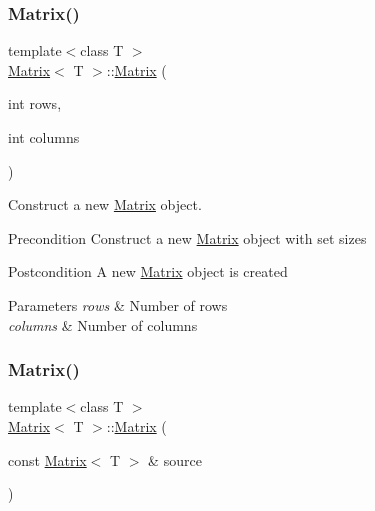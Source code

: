 \subsubsection{\texorpdfstring{Matrix()}{Matrix()}\hspace{0.1cm}{\footnotesize\ttfamily [2/3]}}
{\footnotesize\ttfamily template$<$class T $>$ \\
\mbox{\hyperlink{class_matrix}{Matrix}}$<$ T $>$\+::\mbox{\hyperlink{class_matrix}{Matrix}} (\begin{DoxyParamCaption}\item[{int}]{rows,  }\item[{int}]{columns }\end{DoxyParamCaption})}



Construct a new \mbox{\hyperlink{class_matrix}{Matrix}} object. 

\begin{DoxyPrecond}{Precondition}
Construct a new \mbox{\hyperlink{class_matrix}{Matrix}} object with set sizes 
\end{DoxyPrecond}
\begin{DoxyPostcond}{Postcondition}
A new \mbox{\hyperlink{class_matrix}{Matrix}} object is created 
\end{DoxyPostcond}

\begin{DoxyParams}{Parameters}
{\em rows} & Number of rows \\
\hline
{\em columns} & Number of columns \\
\hline
\end{DoxyParams}
\mbox{\label{class_matrix_abc1e84ee28720ecc8a6807bb3f09f43e}} 
\subsubsection{\texorpdfstring{Matrix()}{Matrix()}\hspace{0.1cm}{\footnotesize\ttfamily [3/3]}}
{\footnotesize\ttfamily template$<$class T $>$ \\
\mbox{\hyperlink{class_matrix}{Matrix}}$<$ T $>$\+::\mbox{\hyperlink{class_matrix}{Matrix}} (\begin{DoxyParamCaption}\item[{const \mbox{\hyperlink{class_matrix}{Matrix}}$<$ T $>$ \&}]{source }\end{DoxyParamCaption})}



